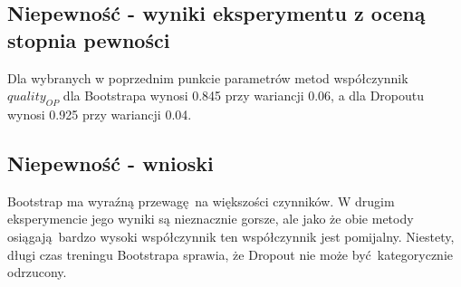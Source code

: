 \subsection{Niepewność - wyniki eksperymentu z oceną stopnia pewności}

Dla wybranych w poprzednim punkcie parametrów metod współczynnik $quality_{OP}$ dla Bootstrapa wynosi 0.845 przy wariancji 0.06, a dla Dropoutu wynosi 0.925 przy wariancji 0.04.

\subsection{Niepewność - wnioski}
Bootstrap ma wyraźną przewagę na większości czynników. W drugim eksperymencie jego wyniki są nieznacznie gorsze, ale jako że obie metody osiągają bardzo wysoki współczynnik ten współczynnik jest pomijalny. Niestety, długi czas treningu Bootstrapa sprawia, że Dropout nie może być kategorycznie odrzucony.



